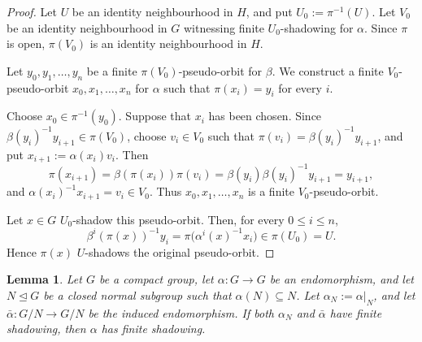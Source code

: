 \documentclass[12pt]{amsart}
\newtheorem{lemma}[theorem]{Lemma}
\theoremstyle{definition}
\numberwithin{equation}{section}
\theoremstyle{remark}
\begin{document}
\begin{proof}
Let $U$ be an identity neighbourhood in $H$, and put
$U_0:=\pi^{-1}(U)$. Let $V_0$ be an identity neighbourhood in $G$
witnessing finite $U_0$-shadowing for $\alpha$. Since $\pi$ is open,
$\pi(V_0)$ is an identity neighbourhood in $H$.

Let $y_0,y_1,\ldots,y_n$ be a finite $\pi(V_0)$-pseudo-orbit for
$\beta$. We construct a finite $V_0$-pseudo-orbit
$x_0,x_1,\ldots,x_n$ for $\alpha$ such that $\pi(x_i)=y_i$ for every
$i$.

Choose $x_0\in\pi^{-1}(y_0)$. Suppose that $x_i$ has been chosen. Since
$\beta(y_i)^{-1}y_{i+1}\in\pi(V_0)$, choose $v_i\in V_0$ such that
$\pi(v_i)=\beta(y_i)^{-1}y_{i+1}$, and put
$x_{i+1}:=\alpha(x_i)v_i$. Then
\[
\pi(x_{i+1})
=\beta(\pi(x_i))\pi(v_i)
=\beta(y_i)\beta(y_i)^{-1}y_{i+1}
=y_{i+1},
\]
and $\alpha(x_i)^{-1}x_{i+1}=v_i\in V_0$. Thus
$x_0,x_1,\ldots,x_n$ is a finite $V_0$-pseudo-orbit.

Let $x\in G$ $U_0$-shadow this pseudo-orbit. Then, for every
$0\leq i\leq n$,
\[
\beta^i(\pi(x))^{-1}y_i
=\pi\bigl(\alpha^i(x)^{-1}x_i\bigr)
\in\pi(U_0)
=U.
\]
Hence $\pi(x)$ $U$-shadows the original pseudo-orbit.
\end{proof}


\begin{lemma}\label{lem:extension-shadowing}
Let $G$ be a compact group, let $\alpha:G\to G$ be an endomorphism,
and let $N\trianglelefteq G$ be a closed normal subgroup such that
$\alpha(N)\subseteq N$. Let $\alpha_N:=\alpha|_N$, and let
$\bar\alpha:G/N\to G/N$ be the induced endomorphism. If both
$\alpha_N$ and $\bar\alpha$ have finite shadowing, then $\alpha$ has
finite shadowing.
\end{lemma}
\end{document}
